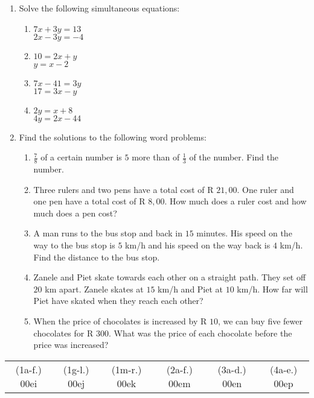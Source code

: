 \begin{eocexercises}{}
\begin{enumerate}[itemsep=5pt, label=\textbf{\arabic*}. ]
\item Solve the following simultaneous equations:
\begin{enumerate}[itemsep=5pt,label=\textbf{(\alph*)}]
\item $7x+3y=13$\\$2x-3y=-4$  
\item $10=2x+y$\\$y=x-2$
\item $7x-41=3y$\\$17=3x-y$
\item $2y=x+8$\\$4y=2x-44$
\end{enumerate}

\item Find the solutions to the following word problems:
\begin{enumerate}[itemsep=5pt,label=\textbf{(\alph*)}]
\item $\frac{7}{8}$ of a certain number is $5$ more than of $\frac{1}{3}$ of the number. Find the number.
\item Three rulers and two pens have a total cost of R $21,00$. One ruler and one pen have a total cost of R $8,00$. How much does a ruler cost and how much does a pen cost? 
\item A man runs to the bus stop and back in $15$ minutes. His speed on the way to the bus stop is $5$ km/h and his speed on the way back is $4$ km/h. Find the distance to the bus stop.
\item Zanele and Piet skate towards each other on a straight path. They set off $20$ km apart. Zanele skates at $15$ km/h and Piet at $10$ km/h. How far will Piet have skated when they reach each other?
\item When the price of chocolates is increased by R $10$, we can buy five fewer chocolates for R $300$. What was the price of each chocolate before the price was increased?
   

\end{enumerate}
\end{enumerate}
\practiceinfo
\par 
\par \begin{tabular}[h]{cccccc} 
(1a-f.) 00ei&  (1g-l.) 00ej& (1m-r.) 00ek&  (2a-f.) 00em&  (3a-d.) 00en&  (4a-e.) 00ep\end{tabular}

\end{eocexercises}
